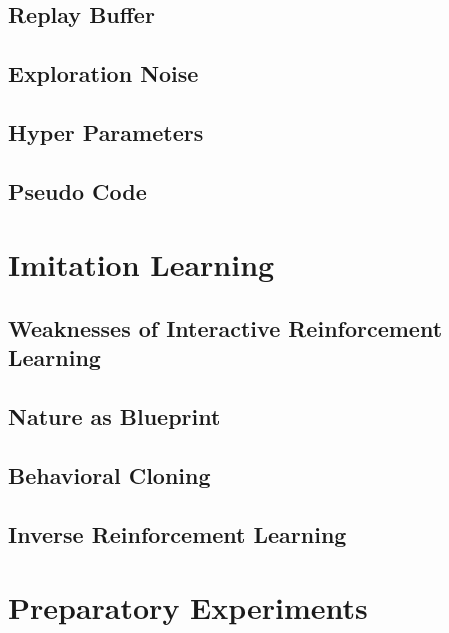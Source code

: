     \subsection{Replay Buffer}\label{subchap:buffer}
    
    \subsection{Exploration Noise}
    
    \subsection{Hyper Parameters}\label{subchap:hyperparameters}
    
    \subsection{Pseudo Code} \label{subchap:pseudo}
    
    
\newpage
\section{Imitation Learning} \label{chap:imitation}
    
        \subsection{Weaknesses of Interactive Reinforcement Learning} \label{subchap:weak}
         
        \subsection{Nature as Blueprint}\label{subchap:nature}
        
        \subsection{Behavioral Cloning}
        
        \subsection{Inverse Reinforcement Learning}\label{subchap:inverse}
        
\newpage
\section{Preparatory Experiments} \label{chap:synthetic}

